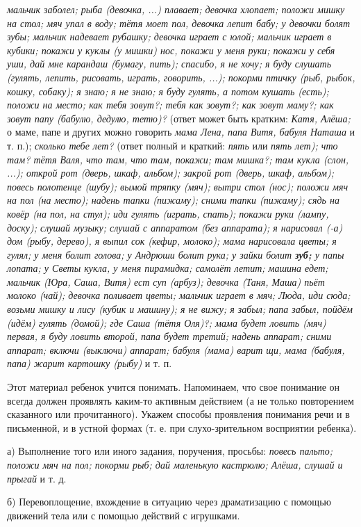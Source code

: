\documentclass[a5paper]{book}
\renewcommand{\emph}[1]{\textit{#1}}
\begin{document}
\emph{мальчик заболел; рыба (девочка, ...) плавает; девочка хлопает;
положи мишку на стол; мяч упал в воду; тётя моет пол, девочка лепит
бабу; у девочки болят зубы; мальчик надевает рубашку; девочка играет с
юлой; мальчик играет в кубики; покажи у куклы (у мишки) нос, покажи у
меня руки; покажи у себя уши, дай мне карандаш (бумагу, пить); спасибо,
я не хочу; я буду слушать (гулять, лепить, рисовать, играть, говорить,
...); покорми птичку (рыб, рыбок, кошку, собаку); я знаю; я не знаю; я
буду гулять, а потом кушать (есть); положи на место; как тебя зовут?;
тебя как зовут?; как зовут маму?; как зовут папу (бабулю, дедулю,
тетю)?} (ответ может быть кратким: \emph{Катя, Алёша;} о маме, папе и
других можно говорить \emph{мама Лена, папа Витя, бабуля Наташа} и т.
п.); \emph{сколько тебе лет?} (ответ полный и краткий: \emph{пять} или
\emph{пять лет); что там? тётя Валя, что там, что там, покажи; там
мишка?; там кукла (слон, ...); открой рот (дверь, шкаф, альбом); закрой
рот (дверь, шкаф, альбом); повесь полотенце (шубу); вымой тряпку (мяч);
вытри стол (нос); положи мяч на пол (на место); надень тапки (пижаму);
сними тапки (пижаму); сядь на ковёр (на пол, на стул); иди гулять
(играть, спать); покажи руки (лампу, доску); слушай музыку; слушай с
аппаратом (без аппарата); я нарисовал (-а) дом (рыбу, дерево), я выпил
сок (кефир, молоко); мама нарисовала цветы; я гулял; у меня болит
голова; у Андрюши болит рука; у зайки болит \textbf{зуб;} у папы лопата;
у Светы кукла, у меня пирамидка; самолёт летит; машина едет; мальчик
(Юра, Саша, Витя) ест суп (арбуз); девочка (Таня, Маша) пьёт молоко
(чай); девочка поливает цветы; мальчик играет в мяч; Люда, иди сюда;
возьми мишку и лису (кубик и машину); я не вижу; я забыл; папа забыл,
пойдём (идём) гулять (домой); где Саша (тётя Оля)?; мама будет ловить
(мяч) первая, я буду ловить второй, папа будет третий; надень аппарат;
сними аппарат; включи (выключи) аппарат; бабуля (мама) варит щи, мама
(бабуля, папа) жарит картошку (рыбу)} и т. п.

Этот материал ребенок учится понимать. Напоминаем, что свое понимание он
всегда должен проявлять каким-то активным действием (а не только
повторением сказанного или прочитанного). Укажем способы проявления
понимания речи и в письменной, и в устной формах (т. е. при
слухо-зрительном восприятии ребенка).

а) Выполнение того или иного задания, поручения, просьбы: \emph{повесь
пальто; положи мяч на пол; покорми рыб; дай маленькую кастрюлю; Алёша,
слушай и прыгай} и т. д.

б) Перевоплощение, вхождение в ситуацию через драматизацию с помощью
движений тела или с помощью действий с игрушками.
\end{document}
